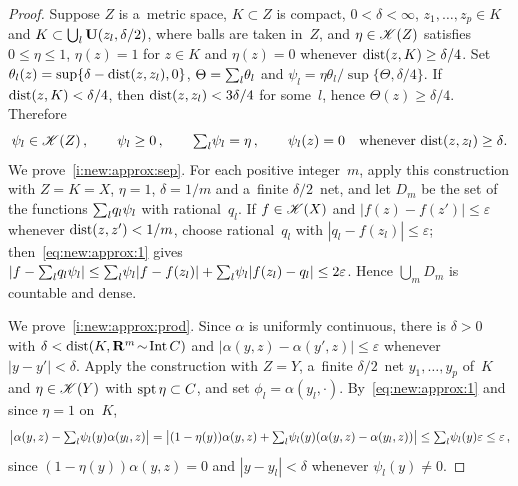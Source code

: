 \documentclass[a4paper,twoside,leqno]{article}
\begin{document}
\begin{proof}
    Suppose $Z$ is a~metric space, $K \subset Z$ is compact, $0 < \delta < \infty$, $z_1, \ldots,
    z_p \in K$ and $K \subset \bigcup_l \mathbf{U}(z_l,\delta/2)$, where balls are taken in~$Z$, and
    $\eta \in \mathscr{K}(Z)$ satisfies $0 \le \eta \le 1$, $\eta(z) = 1$ for $z \in K$ and $\eta(z) =
    0$ whenever $\operatorname{dist}(z,K) \ge \delta/4$. Set $\theta_l(z) = \sup \{ \delta - \operatorname{dist}(z,z_l), 0
    \}$, $\Theta = {\textstyle\sum_{l}^{}} \theta_l$ and $\psi_l = \eta \theta_l / \sup \{ \Theta,
    \delta/4 \}$. If $\operatorname{dist}(z,K) < \delta/4$, then $\operatorname{dist}(z,z_l) < 3\delta/4$ for some~$l$,
    hence $\Theta(z) \ge \delta/4$. Therefore
    \begin{equation}
        \label{eq:new:approx:1}
        \psi_l \in \mathscr{K}(Z) \,, \qquad \psi_l \ge 0 \,, \qquad {\textstyle\sum_{l}^{}} \psi_l = \eta \,,
        \qquad \psi_l(z) = 0 \quad \text{whenever $\operatorname{dist}(z,z_l) \ge \delta$}.
    \end{equation}
    We prove~\ref{i:new:approx:sep}. For each positive integer~$m$, apply this construction with
    $Z = K = X$, $\eta = 1$, $\delta = 1/m$ and a~finite $\delta/2$~net, and let $D_m$ be the set
    of the functions ${\textstyle\sum_{l}^{}} q_l \psi_l$ with rational~$q_l$. If $f \in \mathscr{K}(X)$ and
    $|f(z) - f(z')| \le \varepsilon$ whenever $\operatorname{dist}(z,z') < 1/m$, choose rational~$q_l$ with
    $|q_l - f(z_l)| \le \varepsilon$; then~\eqref{eq:new:approx:1} gives $|f - {\textstyle\sum_{l}^{}} q_l
    \psi_l| \le {\textstyle\sum_{l}^{}} \psi_l |f - f(z_l)| + {\textstyle\sum_{l}^{}} \psi_l |f(z_l) - q_l| \le
    2\varepsilon$. Hence $\bigcup_m D_m$ is countable and dense.

    We prove~\ref{i:new:approx:prod}. Since $\alpha$ is uniformly continuous, there is $\delta >
    0$ with $\delta < \operatorname{dist}(K, \mathbf{R}^m \!\sim\! \operatorname{Int} C)$ and $|\alpha(y,z) - \alpha(y',z)| \le
    \varepsilon$ whenever $|y - y'| < \delta$. Apply the construction with $Z = Y$, a~finite
    $\delta/2$~net $y_1, \ldots, y_p$ of~$K$ and $\eta \in \mathscr{K}(Y)$ with $\operatorname{spt} \eta \subset
    C$, and set $\phi_l = \alpha(y_l,\cdot)$. By~\eqref{eq:new:approx:1} and since $\eta = 1$
    on~$K$,
    \begin{displaymath}
        \bigl| \alpha(y,z) - {\textstyle\sum_{l}^{}} \psi_l(y) \alpha(y_l,z) \bigr|
        = \bigl| (1 - \eta(y)) \alpha(y,z) + {\textstyle\sum_{l}^{}} \psi_l(y) (\alpha(y,z) - \alpha(y_l,z))
        \bigr| \le {\textstyle\sum_{l}^{}} \psi_l(y) \varepsilon \le \varepsilon \,,
    \end{displaymath}
    since $(1 - \eta(y)) \alpha(y,z) = 0$ and $|y - y_l| < \delta$ whenever $\psi_l(y) \ne 0$.
\end{proof}
\end{document}
